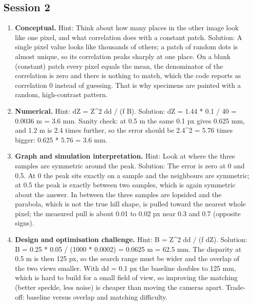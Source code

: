 \documentclass[11pt,a4paper]{article}
\begin{document}
\subsection*{Session 2}
\begin{enumerate}[nosep]
\item \textbf{Conceptual.} Hint: Think about how many places in the other image look like one pixel, and what correlation does with a constant patch. Solution: A single pixel value looks like thousands of others; a patch of random dots is almost unique, so its correlation peaks sharply at one place. On a blank (constant) patch every pixel equals the mean, the denominator of the correlation is zero and there is nothing to match, which the code reports as correlation 0 instead of guessing. That is why specimens are painted with a random, high-contrast pattern.
\item \textbf{Numerical.} Hint: dZ = Z\textasciicircum{}2 dd / (f B). Solution: dZ = 1.44 * 0.1 / 40 = 0.0036 m = 3.6 mm. Sanity check: at 0.5 m the same 0.1 px gives 0.625 mm, and 1.2 m is 2.4 times further, so the error should be 2.4\textasciicircum{}2 = 5.76 times bigger: 0.625 * 5.76 = 3.6 mm.
\item \textbf{Graph and simulation interpretation.} Hint: Look at where the three samples are symmetric around the peak. Solution: The error is zero at 0 and 0.5. At 0 the peak sits exactly on a sample and the neighbours are symmetric; at 0.5 the peak is exactly between two samples, which is again symmetric about the answer. In between the three samples are lopsided and the parabola, which is not the true hill shape, is pulled toward the nearest whole pixel; the measured pull is about 0.01 to 0.02 px near 0.3 and 0.7 (opposite signs).
\item \textbf{Design and optimisation challenge.} Hint: B = Z\textasciicircum{}2 dd / (f dZ). Solution: B = 0.25 * 0.05 / (1000 * 0.0002) = 0.0625 m = 62.5 mm. The disparity at 0.5 m is then 125 px, so the search range must be wider and the overlap of the two views smaller. With dd = 0.1 px the baseline doubles to 125 mm, which is hard to build for a small field of view, so improving the matching (better speckle, less noise) is cheaper than moving the cameras apart. Trade-off: baseline versus overlap and matching difficulty.
\end{enumerate}
\end{document}
